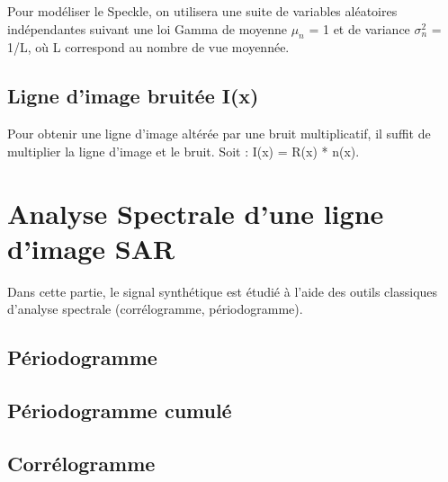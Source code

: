 \documentclass[a4paper,11pt]{article}
\newcommand{\FSource}[1]{%
  
  }
\begin{document}
Pour modéliser le Speckle, on utilisera une suite de variables aléatoires indépendantes suivant une loi Gamma de moyenne $\mu_n$ = 1 et de variance $\sigma_n^2$ = 1/L, où L correspond au nombre de vue moyennée.

\vspace{0.5cm}

\FSource{matlab/2.m}

\vspace{0.5cm}

\subsection{Ligne d'image bruitée I(x)}

Pour obtenir une ligne d'image altérée par une bruit multiplicatif, il suffit de multiplier la ligne d'image et le bruit. Soit :
I(x) = R(x) * n(x).


\newpage

\section{Analyse Spectrale d'une ligne d'image SAR}

Dans cette partie, le signal synthétique est étudié à l'aide des outils classiques d'analyse spectrale (corrélogramme, périodogramme).

\subsection{Périodogramme}


\vspace{0.5cm}

\FSource{matlab/3.m}

\vspace{0.5cm}

\subsection{Périodogramme cumulé}


\vspace{0.5cm}

\FSource{matlab/4.m}

\vspace{0.5cm}

\subsection{Corrélogramme}
\end{document}
